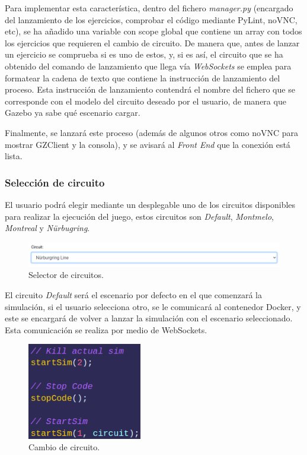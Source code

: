 \documentclass[a4paper, 12pt]{book}
\begin{document}
Para implementar esta característica, dentro del fichero \emph{manager.py} (encargado del lanzamiento de los ejercicios, comprobar el código mediante PyLint, noVNC, etc), se ha añadido una variable con scope global que contiene un array con todos los ejercicios que requieren el cambio de circuito. De manera que, antes de lanzar un ejercicio se comprueba si es uno de estos, y, si es así, el circuito que se ha obtenido del comando de lanzamiento que llega vía \emph{WebSockets} se emplea para formatear la cadena de texto que contiene la instrucción de lanzamiento del proceso. Esta instrucción de lanzamiento contendrá el nombre del fichero que se corresponde con el modelo del circuito deseado por el usuario, de manera que Gazebo ya sabe qué escenario cargar.

Finalmente, se lanzará este proceso (además de algunos otros como noVNC para mostrar GZClient y la consola), y se avisará al \emph{Front End} que la conexión está lista.

\subsubsection{Selección de circuito}
\label{subsec:follow_line_game_circuito}

El usuario podrá elegir mediante un desplegable uno de los circuitos disponibles para realizar la ejecución del juego, estos circuitos son \emph{Default}, \emph{Montmelo}, \emph{Montreal} y \emph{Nürbugring}. 

\begin{figure}[H]
	\centering
    \includegraphics[width=15cm]{img/circuit_selector.png}
    \caption{Selector de circuitos.}
    \label{figura:circuit_selector}
\end{figure}

El circuito \emph{Default} será el escenario por defecto en el que comenzará la simulación, si el usuario selecciona otro, se le comunicará al contenedor Docker, y este se encargará de volver a lanzar la simulación con el escenario seleccionado. Esta comunicación se realiza por medio de WebSockets.

\begin{figure}[H]
	\centering
    \includegraphics[width=5cm]{img/select_circuit_code.png}
    \caption{Cambio de circuito.}
    \label{figura:circuit_selector}
\end{figure}
\end{document}
